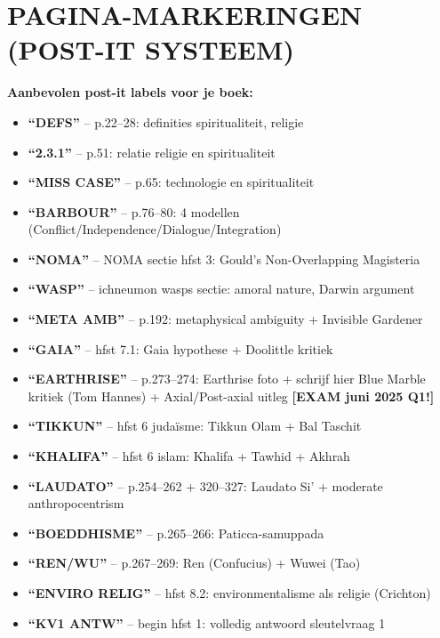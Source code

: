 \documentclass[a4paper,10pt]{article}
\begin{document}
\vspace{8pt}

\section{PAGINA-MARKERINGEN (POST-IT SYSTEEM)}

\begin{infobox}
\textbf{Aanbevolen post-it labels voor je boek:}
\begin{itemize}[noitemsep]
  \item \textbf{``DEFS''} -- p.22--28: definities spiritualiteit, religie
  \item \textbf{``2.3.1''} -- p.51: relatie religie en spiritualiteit
  \item \textbf{``MISS CASE''} -- p.65: technologie en spiritualiteit
  \item \textbf{``BARBOUR''} -- p.76--80: 4 modellen (Conflict/Independence/Dialogue/Integration)
  \item \textbf{``NOMA''} -- NOMA sectie hfst 3: Gould's Non-Overlapping Magisteria
  \item \textbf{``WASP''} -- ichneumon wasps sectie: amoral nature, Darwin argument
  \item \textbf{``META AMB''} -- p.192: metaphysical ambiguity + Invisible Gardener
  \item \textbf{``GAIA''} -- hfst 7.1: Gaia hypothese + Doolittle kritiek
  \item \textbf{``EARTHRISE''} -- p.273--274: Earthrise foto + schrijf hier Blue Marble kritiek (Tom Hannes) + Axial/Post-axial uitleg \textbf{[EXAM juni 2025 Q1!]}
  \item \textbf{``TIKKUN''} -- hfst 6 judaïsme: Tikkun Olam + Bal Taschit
  \item \textbf{``KHALIFA''} -- hfst 6 islam: Khalifa + Tawhid + Akhrah
  \item \textbf{``LAUDATO''} -- p.254--262 + 320--327: Laudato Si' + moderate anthropocentrism
  \item \textbf{``BOEDDHISME''} -- p.265--266: Paticca-samuppada
  \item \textbf{``REN/WU''} -- p.267--269: Ren (Confucius) + Wuwei (Tao)
  \item \textbf{``ENVIRO RELIG''} -- hfst 8.2: environmentalisme als religie (Crichton)
  \item \textbf{``KV1 ANTW''} -- begin hfst 1: volledig antwoord sleutelvraag 1

\end{itemize}
\end{infobox}
\end{document}
